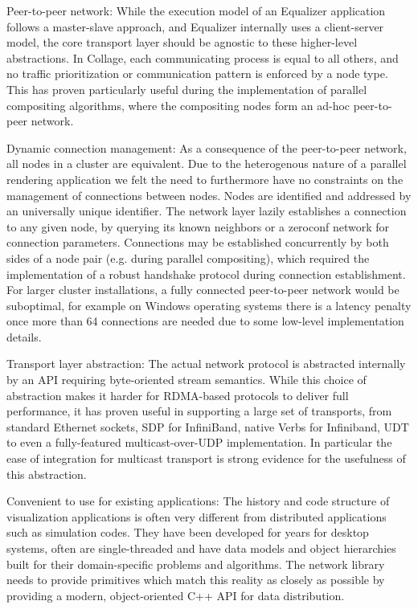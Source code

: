 \begin{compactdesc}

\item[Peer-to-peer network:] While the execution model of an Equalizer
application follows a master-slave approach, and Equalizer internally uses a
client-server model, the core transport layer should be agnostic to these
higher-level abstractions. In Collage, each communicating process is equal to
all others, and no traffic prioritization or communication pattern is enforced
by a node type. This has proven particularly useful during the implementation of
parallel compositing algorithms, where the compositing nodes form an ad-hoc
peer-to-peer network.

\item[Dynamic connection management:] As a consequence of the peer-to-peer
network, all nodes in a cluster are equivalent. Due to the heterogenous nature
of a parallel rendering application we felt the need to furthermore have no
constraints on the management of connections between nodes. Nodes are identified
and addressed by an universally unique identifier. The network layer lazily
establishes a connection to any given node, by querying its known neighbors or a
zeroconf network for connection parameters. Connections may be established
concurrently by both sides of a node pair (e.g. during parallel compositing),
which required the implementation of a robust handshake protocol during
connection establishment. For larger cluster installations, a fully connected
peer-to-peer network would be suboptimal, for example on Windows operating
systems there is a latency penalty once more than 64 connections are needed due
to some low-level implementation details.

\item[Transport layer abstraction:] The actual network protocol is abstracted
internally by an API requiring byte-oriented stream semantics. While this choice
of abstraction makes it harder for RDMA-based protocols to deliver full
performance, it has proven useful in supporting a large set of transports, from
standard Ethernet sockets, SDP for InfiniBand, native Verbs for Infiniband, UDT
to even a fully-featured multicast-over-UDP implementation. In particular the
ease of integration for multicast transport is strong evidence for the
usefulness of this abstraction.

\item[Convenient to use for existing applications:] The history and code
structure of visualization applications is often very different from distributed
applications such as simulation codes. They have been developed for years for
desktop systems, often are single-threaded and have data models and object
hierarchies built for their domain-specific problems and algorithms. The network
library needs to provide primitives which match this reality as closely as
possible by providing a modern, object-oriented C++ API for data distribution.

\end{compactdesc}


